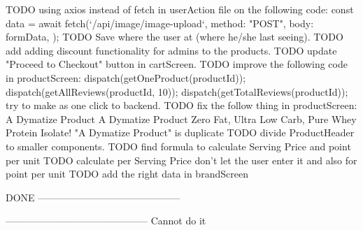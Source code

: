 TODO  using axios instead of fetch in userAction file on the following code: 
       const data = await fetch(`/api/image/image-upload`, {
      method: "POST",
      body: formData,
    });
TODO  Save where the user at (where he/she last seeing).
TODO  add adding discount functionality for admins to the products.
TODO  update "Proceed to Checkout" button in cartScreen.
TODO improve the following code in productScreen:
dispatch(getOneProduct(productId));
dispatch(getAllReviews(productId, 10));
dispatch(getTotalReviews(productId));
try to make as one click to backend.
TODO  fix the follow thing in productScreen:
A Dymatize Product
A Dymatize Product Zero Fat, Ultra Low Carb, Pure Whey Protein Isolate!
"A Dymatize Product" is duplicate
TODO divide ProductHeader to smaller components.
TODO find formula to calculate Serving Price and point per unit
TODO  calculate per Serving Price don't let the user enter it and also for point per unit
TODO   add the right data in brandScreen 

DONE
--------------------------------------------



--------------------------------------------
Cannot do it
